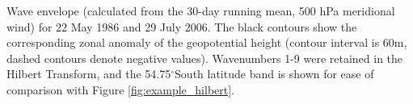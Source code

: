 \label{fig:example_envelope}
Wave envelope (calculated from the 30-day running mean, 500 hPa meridional wind) for 22 May 1986 and 29 July 2006. The black contours show the corresponding zonal anomaly of the geopotential height (contour interval is 60m, dashed contours denote negative values). Wavenumbers 1-9 were retained in the Hilbert Transform, and the 54.75$^{\circ}$South latitude band is shown for ease of comparison with Figure \ref{fig:example_hilbert}. 